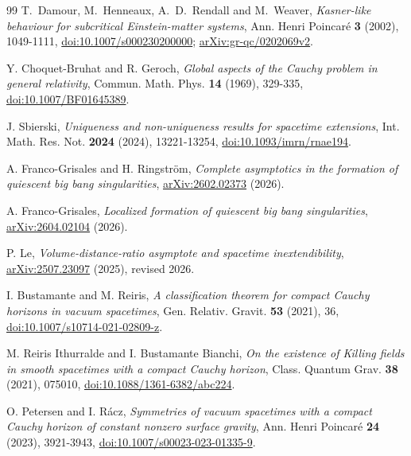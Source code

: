 \documentclass[10pt,a4paper]{article}
\numberwithin{equation}{section}
\theoremstyle{definition}
\theoremstyle{remark}
\begin{document}
\begin{thebibliography}{99}
T.~Damour, M.~Henneaux, A.~D.~Rendall and M.~Weaver,
\emph{Kasner-like behaviour for subcritical Einstein-matter systems},
Ann. Henri Poincar\'e \textbf{3} (2002), 1049-1111,
\href{https://doi.org/10.1007/s000230200000}{doi:10.1007/s000230200000};
\href{https://arxiv.org/abs/gr-qc/0202069v2}{arXiv:gr-qc/0202069v2}.

Y. Choquet-Bruhat and R. Geroch,
\emph{Global aspects of the Cauchy problem in general relativity},
Commun. Math. Phys. \textbf{14} (1969), 329-335,
\href{https://doi.org/10.1007/BF01645389}{doi:10.1007/BF01645389}.

J. Sbierski,
\emph{Uniqueness and non-uniqueness results for spacetime extensions},
Int. Math. Res. Not. \textbf{2024} (2024), 13221-13254,
\href{https://doi.org/10.1093/imrn/rnae194}{doi:10.1093/imrn/rnae194}.

A. Franco-Grisales and H. Ringstr\"om,
\emph{Complete asymptotics in the formation of quiescent big bang singularities},
\href{https://arxiv.org/abs/2602.02373}{arXiv:2602.02373} (2026).

A. Franco-Grisales,
\emph{Localized formation of quiescent big bang singularities},
\href{https://arxiv.org/abs/2604.02104}{arXiv:2604.02104} (2026).

P. Le,
\emph{Volume-distance-ratio asymptote and spacetime inextendibility},
\href{https://arxiv.org/abs/2507.23097}{arXiv:2507.23097} (2025),
revised 2026.

I. Bustamante and M. Reiris,
\emph{A classification theorem for compact Cauchy horizons in vacuum
spacetimes},
Gen. Relativ. Gravit. \textbf{53} (2021), 36,
\href{https://doi.org/10.1007/s10714-021-02809-z}
{doi:10.1007/s10714-021-02809-z}.

M. Reiris Ithurralde and I. Bustamante Bianchi,
\emph{On the existence of Killing fields in smooth spacetimes with a
compact Cauchy horizon},
Class. Quantum Grav. \textbf{38} (2021), 075010,
\href{https://doi.org/10.1088/1361-6382/abc224}
{doi:10.1088/1361-6382/abc224}.

O. Petersen and I. R\'acz,
\emph{Symmetries of vacuum spacetimes with a compact Cauchy horizon of
constant nonzero surface gravity},
Ann. Henri Poincar\'e \textbf{24} (2023), 3921-3943,
\href{https://doi.org/10.1007/s00023-023-01335-9}
{doi:10.1007/s00023-023-01335-9}.

\end{thebibliography}
\end{document}
